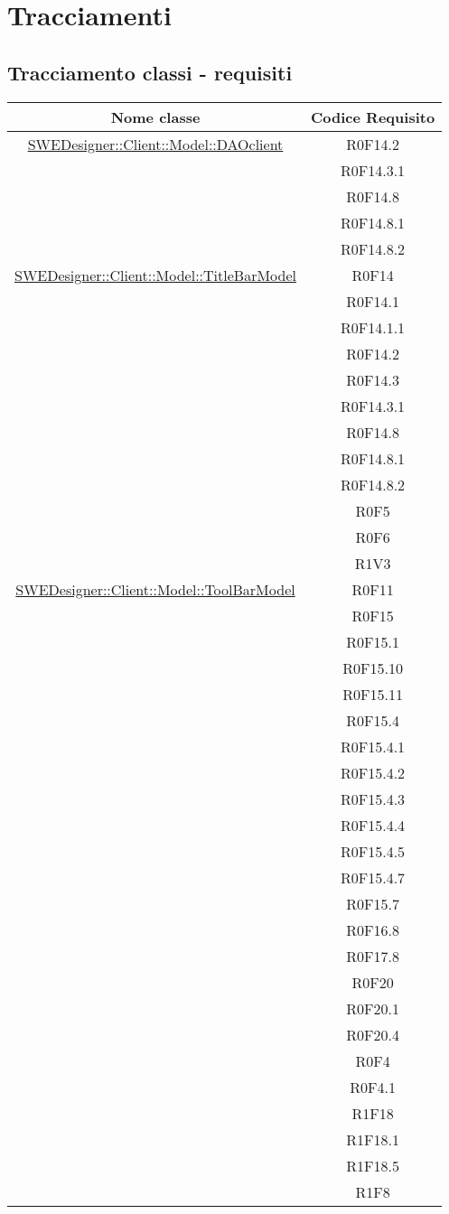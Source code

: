 \documentclass[../DefinizioneDiProdotto.tex]{subfiles}
\begin{document}
	\section{Tracciamenti}
		\subsection{Tracciamento classi - requisiti}
			\normalsize
			\begin{longtable}{|c|c|}
				\hline
				\textbf{Nome classe} & \textbf{Codice Requisito} \\
				\hline
				\endhead
				\hyperlink{SWEDesigner::Client::Model::DAOclient}{SWEDesigner::Client::Model::DAOclient}
				& R0F14.2\\
				& R0F14.3.1\\
				& R0F14.8\\
				& R0F14.8.1\\
				& R0F14.8.2\\
				\hline

				\hyperlink{SWEDesigner::Client::Model::TitleBarModel}{SWEDesigner::Client::Model::TitleBarModel}
				& R0F14\\
				& R0F14.1\\
				& R0F14.1.1\\
				& R0F14.2\\
				& R0F14.3\\
				& R0F14.3.1\\
				& R0F14.8\\
				& R0F14.8.1\\
				& R0F14.8.2\\
				& R0F5\\
				& R0F6\\
				& R1V3\\
				\hline

				\hyperlink{SWEDesigner::Client::Model::ToolBarModel}{SWEDesigner::Client::Model::ToolBarModel}
				& R0F11\\
				& R0F15\\
				& R0F15.1\\
				& R0F15.10\\
				& R0F15.11\\
				& R0F15.4\\
				& R0F15.4.1\\
				& R0F15.4.2\\
				& R0F15.4.3\\
				& R0F15.4.4\\
				& R0F15.4.5\\
				& R0F15.4.7\\
				& R0F15.7\\
				& R0F16.8\\
				& R0F17.8\\
				& R0F20\\
				& R0F20.1\\
				& R0F20.4\\
				& R0F4\\
				& R0F4.1\\
				& R1F18\\
				& R1F18.1\\
				& R1F18.5\\
				& R1F8\\
				\hline


\end{longtable}
\end{document}
